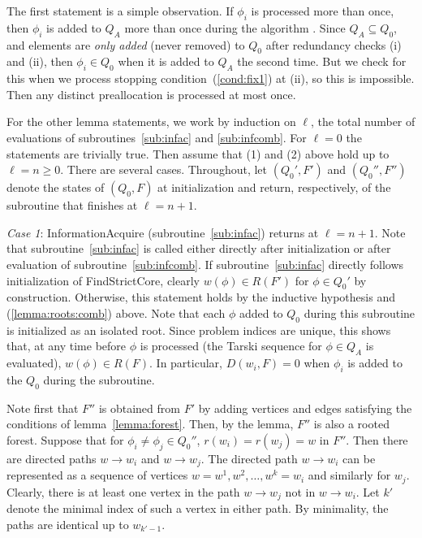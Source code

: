 \documentclass[11pt,reqno]{amsart}
\theoremstyle{definition}
\numberwithin{equation}{section}
\newcommand{\pre}{\phi}
\newcommand{\sub}{\subseteq}
\newcommand{\acto}{Q_0}
\newcommand{\acta}{Q_A}
\newcommand{\forest}{F}
\newcommand{\roott}{R}
\newcommand{\depth}{D}
\newcommand{\infacredi}{(i)\xspace}
\newcommand{\infacredii}{(ii)\xspace}
\newcommand{\infacstoptwii}{(ii)\xspace}
\begin{document}
The first statement is a simple observation.
If $\pre_i$ is processed more than once, then $\pre_i$ is added to $\acta$ more than once during the algorithm . 
Since $\acta \sub \acto$, and elements are \emph{only added} (never removed) to $\acto$ after redundancy checks \infacredi and \infacredii, then $\pre_i \in \acto$ when it is added to $\acta$ the second time. 
But we check for this when we process stopping condition~(\ref{cond:fix1}) at \infacstoptwii, so this is impossible.  
Then any distinct preallocation is processed at most once. 

For the other lemma statements, we work by induction on $\ell$, the total number of evaluations of subroutines~\ref{sub:infac} and \ref{sub:infcomb}. 
For $\ell = 0$ the statements are trivially true. 
Then assume that (1) and (2) above hold up to $\ell = n \geq 0$. 
There are several cases. 
Throughout, let $(\acto',\forest')$ and $(\acto'',\forest'')$ denote the states of $(\acto,\forest)$ at initialization and return, respectively, of the subroutine that finishes at $\ell = n + 1$.  

\emph{Case 1}: InformationAcquire (subroutine~\ref{sub:infac}) returns at $\ell = n + 1$. 
Note that subroutine~\ref{sub:infac} is called either directly after initialization or after evaluation of subroutine~\ref{sub:infcomb}. 
If subroutine~\ref{sub:infac} directly follows initialization of FindStrictCore, clearly $w(\pre) \in \roott(\forest')$ for $\pre \in \acto'$ by construction.
Otherwise, this statement holds by the inductive hypothesis and (\ref{lemma:roots:comb}) above. 
Note that each $\pre$ added to $\acto$ during this subroutine is initialized as an isolated root. 
Since problem indices are unique, this shows that, at any time before $\pre$ is processed (the Tarski sequence for $\pre \in \acta$ is evaluated), $w(\pre) \in \roott(\forest)$. 
In particular, $\depth(w_i, \forest) = 0$ when $\pre_i$ is added to the $\acto$ during the subroutine. 

Note first that $\forest''$ is obtained from $\forest'$ by adding vertices and edges satisfying the conditions of lemma~\ref{lemma:forest}. 
Then, by the lemma, $\forest''$ is also a rooted forest.
Suppose that for $\pre_i \not = \pre_j \in \acto''$, $r(w_i) = r(w_j) = w$ in $\forest''$. 
Then there are directed paths $w \to w_i$ and $w \to w_j$. 
The directed path $w \to w_i$ can be represented as a sequence of vertices $w = w^1,w^2,\hdots, w^k = w_i$ and similarly for $w_j$. 
Clearly, there is at least one vertex in the path $w \to w_j$ not in $w \to w_i$. 
Let $k'$ denote the minimal index of such a vertex in either path. 
By minimality, the paths are identical up to $w_{k' - 1}$. 
\end{document}
